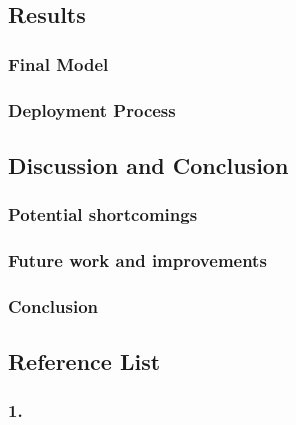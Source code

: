 \documentclass[a4paper,9pt,twocolumn,twoside,]{pinp}
\begin{document}
\hypertarget{results}{%
\subsection{Results}\label{results}}

\hypertarget{final-model}{%
\subsubsection{Final Model}\label{final-model}}

\hypertarget{deployment-process}{%
\subsubsection{Deployment Process}\label{deployment-process}}

\hypertarget{discussion-and-conclusion}{%
\subsection{Discussion and Conclusion}\label{discussion-and-conclusion}}

\hypertarget{potential-shortcomings}{%
\subsubsection{Potential shortcomings}\label{potential-shortcomings}}

\hypertarget{future-work-and-improvements}{%
\subsubsection{Future work and
improvements}\label{future-work-and-improvements}}

\hypertarget{conclusion}{%
\subsubsection{Conclusion}\label{conclusion}}

\newpage

\hypertarget{reference-list}{%
\subsection{Reference List}\label{reference-list}}

\hypertarget{section}{%
\subsubsection{1.}\label{section}}
\end{document}
